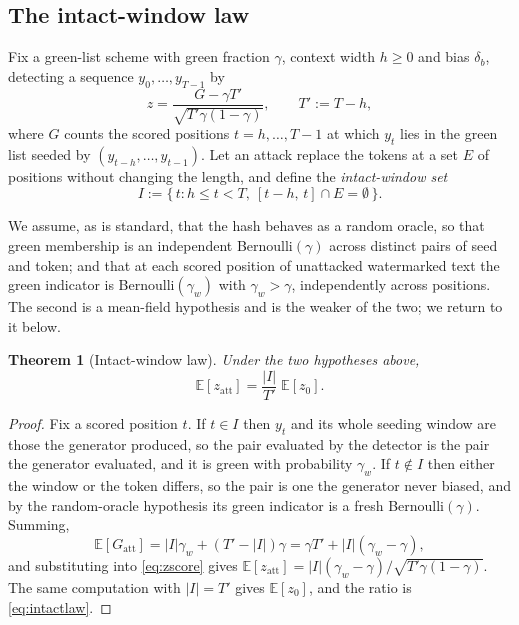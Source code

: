 \documentclass{article}
\theoremstyle{plain}
\newtheorem{theorem}{Theorem}[section]
\theoremstyle{definition}
\numberwithin{equation}{section}
\begin{document}
\subsection{The intact-window law}

Fix a green-list scheme with green fraction $\gamma$, context width
$h \ge 0$ and bias $\delta_b$, detecting a sequence $y_0,\dots,y_{T-1}$
by
\begin{equation}\label{eq:zscore}
z = \frac{G - \gamma T'}{\sqrt{T'\gamma(1-\gamma)}},
\qquad T' := T - h,
\end{equation}
where $G$ counts the scored positions $t = h,\dots,T-1$ at which $y_t$
lies in the green list seeded by $(y_{t-h},\dots,y_{t-1})$. Let an
attack replace the tokens at a set $E$ of positions without changing the
length, and define the \emph{intact-window set}
\begin{equation}\label{eq:intact}
I := \bigl\{\, t : h \le t < T,\ [t-h,\,t]\cap E = \emptyset \,\bigr\}.
\end{equation}

We assume, as is standard, that the hash behaves as a random oracle, so
that green membership is an independent Bernoulli$(\gamma)$ across
distinct pairs of seed and token; and that at each scored position of
unattacked watermarked text the green indicator is Bernoulli$(\gamma_w)$
with $\gamma_w > \gamma$, independently across positions. The second is
a mean-field hypothesis and is the weaker of the two; we return to it
below.

\begin{theorem}[Intact-window law]\label{thm:intact}
Under the two hypotheses above,
\begin{equation}\label{eq:intactlaw}
\mathbb{E}[z_{\mathrm{att}}]
= \frac{|I|}{T'}\;\mathbb{E}[z_0].
\end{equation}
\end{theorem}

\begin{proof}
Fix a scored position $t$. If $t \in I$ then $y_t$ and its whole seeding
window are those the generator produced, so the pair evaluated by the
detector is the pair the generator evaluated, and it is green with
probability $\gamma_w$. If $t \notin I$ then either the window or the
token differs, so the pair is one the generator never biased, and by the
random-oracle hypothesis its green indicator is a fresh
Bernoulli$(\gamma)$. Summing,
\begin{equation}\label{eq:greencount}
\mathbb{E}[G_{\mathrm{att}}]
= |I|\gamma_w + (T'-|I|)\gamma
= \gamma T' + |I|(\gamma_w - \gamma),
\end{equation}
and substituting into \eqref{eq:zscore} gives
$\mathbb{E}[z_{\mathrm{att}}] = |I|(\gamma_w-\gamma)/
\sqrt{T'\gamma(1-\gamma)}$. The same computation with $|I| = T'$ gives
$\mathbb{E}[z_0]$, and the ratio is \eqref{eq:intactlaw}.
\end{proof}
\end{document}
